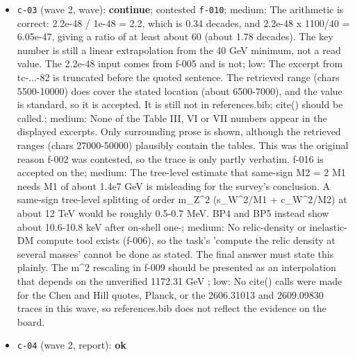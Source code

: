\documentclass[11pt,a4paper]{article}
\begin{document}
\begin{itemize}
  \item \texttt{c-03} (wave 2, wave): \textbf{continue}; contested \texttt{f-010}; medium: The arithmetic is correct: 2.2e-48 / 1e-48 = 2.2, which is 0.34 decades, and 2.2e-48 x 1100/40 = 6.05e-47, giving a ratio of at least about 60 (about 1.78 decades). The key number is still a linear extrapolation from the 40 GeV minimum, not a read value. The 2.2e-48 input comes from f-005 and is not; low: The excerpt from tc-...-82 is truncated before the quoted sentence. The retrieved range (chars 5500-10000) does cover the stated location (about 6500-7000), and the value is standard, so it is accepted. It is still not in references.bib; cite() should be called.; medium: None of the Table III, VI or VII numbers appear in the displayed excerpts. Only surrounding prose is shown, although the retrieved ranges (chars 27000-50000) plausibly contain the tables. This was the original reason f-002 was contested, so the trace is only partly verbatim. f-016 is accepted on the; medium: The tree-level estimate that same-sign M2 = 2 M1 needs M1 of about 1.4e7 GeV is misleading for the survey's conclusion. A same-sign tree-level splitting of order m\_Z\textasciicircum{}2 (s\_W\textasciicircum{}2/M1 + c\_W\textasciicircum{}2/M2) at about 12 TeV would be roughly 0.5-0.7 MeV. BP4 and BP5 instead show about 10.6-10.8 keV after on-shell one-; medium: No relic-density or inelastic-DM compute tool exists (f-006), so the task's 'compute the relic density at several masses' cannot be done as stated. The final answer must state this plainly. The m\textasciicircum{}2 rescaling in f-009 should be presented as an interpolation that depends on the unverified 1172.31 GeV ; low: No cite() calls were made for the Chen and Hill quotes, Planck, or the 2606.31013 and 2609.09830 traces in this wave, so references.bib does not reflect the evidence on the board.
  \item \texttt{c-04} (wave 2, report): \textbf{ok}

\end{itemize}
\end{document}
